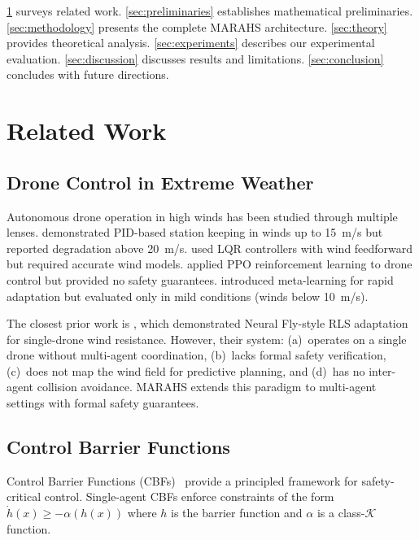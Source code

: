 \documentclass[11pt,twocolumn]{article}
\providecommand{\Cref}[1]{\ref{#1}}
\theoremstyle{definition}
\newcommand{\cK}{\mathcal{K}}
\begin{document}
\Cref{sec:related_work} surveys related work. \Cref{sec:preliminaries} establishes mathematical preliminaries. \Cref{sec:methodology} presents the complete MARAHS architecture. \Cref{sec:theory} provides theoretical analysis. \Cref{sec:experiments} describes our experimental evaluation. \Cref{sec:discussion} discusses results and limitations. \Cref{sec:conclusion} concludes with future directions.

\section{Related Work}
\label{sec:related_work}

\subsection{Drone Control in Extreme Weather}

Autonomous drone operation in high winds has been studied through multiple lenses. \citet{Duggal2020} demonstrated PID-based station keeping in winds up to 15~m/s but reported degradation above 20~m/s. \citet{Abichandani2019} used LQR controllers with wind feedforward but required accurate wind models. \citet{PPO2017} applied PPO reinforcement learning to drone control but provided no safety guarantees. \citet{Peng2021} introduced meta-learning for rapid adaptation but evaluated only in mild conditions (winds below 10~m/s).

The closest prior work is \citet{NeuralFly2022}, which demonstrated Neural Fly-style RLS adaptation for single-drone wind resistance. However, their system: (a)~operates on a single drone without multi-agent coordination, (b)~lacks formal safety verification, (c)~does not map the wind field for predictive planning, and (d)~has no inter-agent collision avoidance. MARAHS extends this paradigm to multi-agent settings with formal safety guarantees.

\subsection{Control Barrier Functions}

Control Barrier Functions (CBFs)~\citep{Ames2014,Ames2019} provide a principled framework for safety-critical control. Single-agent CBFs enforce constraints of the form $\dot{h}(x) \geq -\alpha(h(x))$ where $h$ is the barrier function and $\alpha$ is a class-$\cK$ function.
\end{document}
